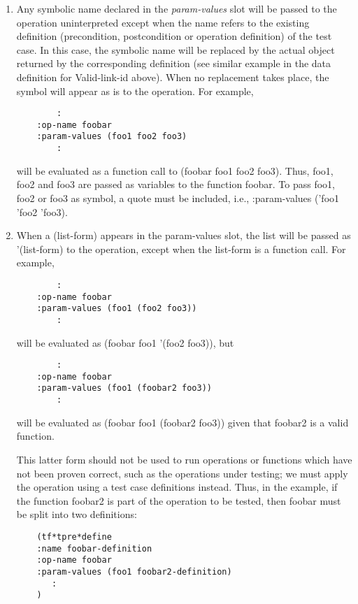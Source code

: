 \begin {enumerate}
\item Any symbolic name declared in the {\it param-values} slot will be
  passed to the operation uninterpreted except when the name refers to the
  existing definition (precondition, postcondition or operation
  definition) of the test case. In this case, the symbolic name will be
  replaced by the actual object returned by the corresponding definition
  (see similar example in the data definition for Valid-link-id above).
  When no replacement takes place, the symbol will appear as is to the
  operation.  For example, 
\small\begin{verbatim} 
        :
    :op-name foobar
    :param-values (foo1 foo2 foo3)
        :
\end{verbatim}\normalsize

will be evaluated as a function call to (foobar foo1 foo2 foo3).
Thus, foo1, foo2 and foo3 are passed as variables to the function
foobar.  To pass foo1, foo2 or foo3 as symbol, a quote must be
included, i.e., :param-values ('foo1 'foo2 'foo3).

\item When a (list-form) appears in the param-values slot, the list
will be passed as '(list-form) to the operation, except when the
list-form is a function call.
For example,
\small\begin{verbatim}
        :
    :op-name foobar
    :param-values (foo1 (foo2 foo3))
        :
\end{verbatim}\normalsize

will be evaluated as (foobar foo1 '(foo2 foo3)), but


\small\begin{verbatim}
        :
    :op-name foobar
    :param-values (foo1 (foobar2 foo3))
        :
\end{verbatim}\normalsize

will be evaluated as (foobar foo1 (foobar2 foo3)) given that
foobar2 is a valid function.

This latter form should not be used to run  operations or functions
which have not been proven correct, such as the operations under testing; 
we must apply the operation using a test case definitions instead. 
Thus, in the example, if the function foobar2
is part of the operation to be tested, then foobar must be split into
two definitions:

\small\begin{verbatim}
    (tf*tpre*define
    :name foobar-definition
    :op-name foobar
    :param-values (foo1 foobar2-definition)
       :
    )
\end{verbatim}\normalsize



\end{enumerate}
